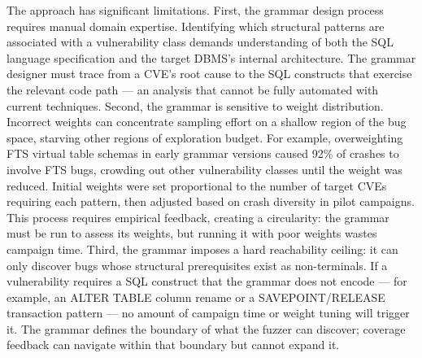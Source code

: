 The approach has significant limitations. First, the grammar design process requires manual domain expertise. Identifying which structural patterns are associated with a vulnerability class demands understanding of both the SQL language specification and the target DBMS's internal architecture. The grammar designer must trace from a CVE's root cause to the SQL constructs that exercise the relevant code path --- an analysis that cannot be fully automated with current techniques. Second, the grammar is sensitive to weight distribution. Incorrect weights can concentrate sampling effort on a shallow region of the bug space, starving other regions of exploration budget. For example, overweighting FTS virtual table schemas in early grammar versions caused 92\% of crashes to involve FTS bugs, crowding out other vulnerability classes until the weight was reduced. Initial weights were set proportional to the number of target CVEs requiring each pattern, then adjusted based on crash diversity in pilot campaigns. This process requires empirical feedback, creating a circularity: the grammar must be run to assess its weights, but running it with poor weights wastes campaign time. Third, the grammar imposes a hard reachability ceiling: it can only discover bugs whose structural prerequisites exist as non-terminals. If a vulnerability requires a SQL construct that the grammar does not encode --- for example, an ALTER TABLE column rename or a SAVEPOINT/RELEASE transaction pattern --- no amount of campaign time or weight tuning will trigger it. The grammar defines the boundary of what the fuzzer can discover; coverage feedback can navigate within that boundary but cannot expand it.


